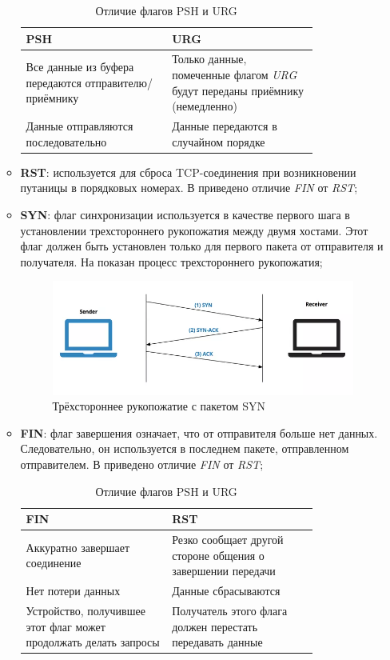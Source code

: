 \begin{itemize}
\begin{itemize}
		\begin{table}[b]
			\centering
			\caption{Отличие флагов PSH и URG}
			\label{tab:psh-urg}
			\begin{tabular}{|C{0.4\linewidth}|C{0.4\linewidth}|}
				\hline
				\bfseries PSH & \bfseries URG\\
				\hline
				Все данные из буфера передаются отправителю/приёмнику&Только данные, помеченные флагом \textit{URG} будут переданы приёмнику (немедленно)\\
				\hline
				Данные отправляются последовательно & Данные передаются в случайном порядке\\
				\hline
			\end{tabular}
		\end{table}
		
		\item \textbf{RST}: используется для сброса TCP-соединения при возникновении путаницы в порядковых номерах. В  приведено отличие \textit{FIN} от \textit{RST};
		\item \textbf{SYN}: флаг синхронизации используется в качестве первого шага в установлении трехстороннего рукопожатия между двумя хостами. Этот флаг должен быть установлен только для первого пакета от отправителя и получателя. На  показан процесс трехстороннего рукопожатия; 
		\begin{figure}[t]
			\centering
			\includegraphics[width=0.8\linewidth]{images/handshake}
			\caption{Трёхстороннее рукопожатие с пакетом SYN}
			\label{fig:handshake}
		\end{figure}
		\item \textbf{FIN}: флаг завершения означает, что от отправителя больше нет данных. Следовательно, он используется в последнем пакете, отправленном отправителем. В  приведено отличие \textit{FIN} от \textit{RST};
		
		\begin{table}[h]
			\centering
			\caption{Отличие флагов PSH и URG}
			\label{tab:fin-rst}
			\begin{tabular}{|C{0.4\linewidth}|C{0.4\linewidth}|}
				\hline
				\bfseries FIN & \bfseries RST\\
				\hline
				Аккуратно завершает соединение&Резко сообщает другой стороне общения о завершении передачи\\
				\hline
				Нет потери данных & Данные сбрасываются\\
				\hline
				Устройство, получившее этот флаг может продолжать делать запросы & Получатель этого флага должен перестать передавать данные\\
				\hline
			\end{tabular}
		\end{table}
	\end{itemize}
	

\end{itemize}
